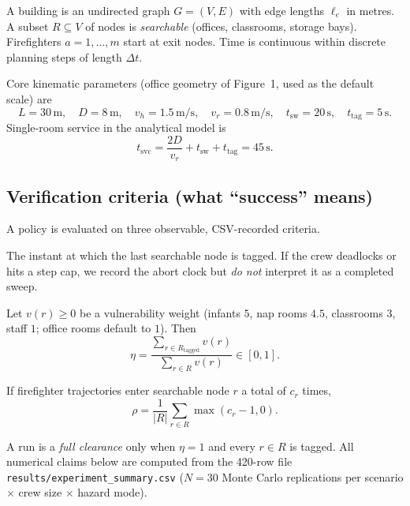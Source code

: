 \documentclass[12pt]{article}
\newcommand{\Tclear}{T_{\mathrm{clear}}}
\newcommand{\tsvc}{t_{\mathrm{svc}}}
\newcommand{\tsw}{t_{\mathrm{sw}}}
\newcommand{\ttag}{t_{\mathrm{tag}}}
\newcommand{\whall}{v_{h}}
\newcommand{\vroom}{v_{r}}
\begin{document}
A building is an undirected graph \(G=(V,E)\) with edge lengths \(\ell_e\) in metres.
A subset \(R\subseteq V\) of nodes is \emph{searchable} (offices, classrooms, storage
bays). Firefighters \(a=1,\ldots,m\) start at exit nodes. Time is continuous within
discrete planning steps of length \(\Delta t\).

Core kinematic parameters (office geometry of Figure~1, used as the default scale) are
\[
  L=30\,\mathrm{m},\quad
  D=8\,\mathrm{m},\quad
  \whall=1.5\,\mathrm{m/s},\quad
  \vroom=0.8\,\mathrm{m/s},\quad
  \tsw=20\,\mathrm{s},\quad
  \ttag=5\,\mathrm{s}.
\]
Single-room service in the analytical model is
\begin{equation}
  \label{eq:tsvc}
  \tsvc
  = \frac{2D}{\vroom} + \tsw + \ttag
  = 45\,\mathrm{s}.
\end{equation}

\subsection{Verification criteria (what ``success'' means)}

A policy is evaluated on three observable, CSV-recorded criteria.
\begin{description}[style=nextline,leftmargin=1.1em]
  \item[Total sweep time \(\Tclear\).]
    The instant at which the last searchable node is tagged. If the crew deadlocks or
    hits a step cap, we record the abort clock but \emph{do not} interpret it as a
    completed sweep.
  \item[Vulnerable-population salvage \(\eta\).]
    Let \(v(r)\ge 0\) be a vulnerability weight (infants \(5\), nap rooms \(4.5\),
    classrooms \(3\), staff \(1\); office rooms default to \(1\)). Then
    \begin{equation}
      \label{eq:eta}
      \eta
      = \frac{\sum_{r\in R_{\mathrm{tagged}}} v(r)}{\sum_{r\in R} v(r)}
      \in [0,1].
    \end{equation}
  \item[Redundancy rate \(\rho\).]
    If firefighter trajectories enter searchable node \(r\) a total of \(c_r\) times,
    \begin{equation}
      \label{eq:rho}
      \rho
      = \frac{1}{|R|}\sum_{r\in R}\max(c_r-1,0).
    \end{equation}
\end{description}
A run is a \emph{full clearance} only when \(\eta=1\) and every \(r\in R\) is tagged.
All numerical claims below are computed from the 420-row file
\texttt{results/experiment\_summary.csv} (\(N=30\) Monte Carlo replications per
scenario \(\times\) crew size \(\times\) hazard mode).
\end{document}
